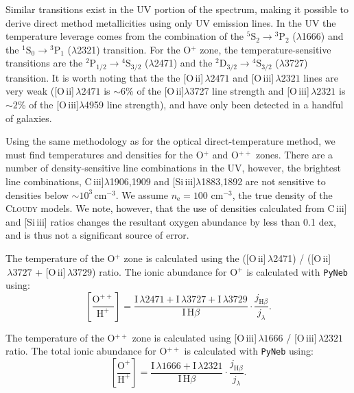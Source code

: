 \documentclass[preprint2]{aastex62}
\newcommand{\Cloudy}{\textsc{Cloudy}\xspace}
\newcommand{\oiii}{[O\,{\sc iii}]\xspace}
\newcommand{\oii}{[O\,{\sc ii}]\xspace}
\newcommand{\SiuIII}{[Si\,{\sc iii}]\xspace}
\newcommand{\ciii}{C\,{\sc iii}]\xspace}
\begin{document}
Similar transitions exist in the UV portion of the spectrum, making it possible to derive direct method metallicities using only UV emission lines. In the UV the temperature leverage comes from the combination of the ${}^5 \mathrm{S}_2 \rightarrow {}^3 \mathrm{P}_2$ ($\lambda$1666) and the ${}^1 \mathrm{S}_0 \rightarrow {}^3 \mathrm{P}_1$ ($\lambda$2321) transition. For the O$^{+}$ zone, the temperature-sensitive transitions are the ${}^2 \mathrm{P}_{1/2} \rightarrow {}^4 \mathrm{S}_{3/2}$ ($\lambda$2471) and the ${}^2 \mathrm{D}_{3/2} \rightarrow {}^4 \mathrm{S}_{3/2}$ ($\lambda$3727) transition. It is worth noting that the the \oii$\,\lambda2471$ and \oiii$\,\lambda2321$ lines are very weak (\oii$\,\lambda2471$ is ${\sim}6$\% of the \oii$\lambda$3727 line strength and \oiii$\,\lambda2321$ is ${\sim}2$\% of the \oiii$\lambda$4959 line strength), and have only been detected in a handful of galaxies.

Using the same methodology as for the optical direct-temperature method, we must find temperatures and densities for the O$^{+}$ and O$^{++}$ zones. There are a number of density-sensitive line combinations in the UV, however, the brightest line combinations, \ciii$\lambda$1906,1909 and \SiuIII$\lambda$1883,1892 are not sensitive to densities below $\sim10^3\,$cm$^{-3}$. We assume $n_{\mathrm{e}} = 100$ cm$^{-3}$, the true density of the \Cloudy models. We note, however, that the use of densities calculated from \ciii and \SiuIII ratios changes the resultant oxygen abundance by less than 0.1 dex, and is thus not a significant source of error.

The temperature of the O$^{+}$ zone is calculated using the (\oii$\,\lambda$2471) / (\oii$\,\lambda 3727$ + \oii$\,\lambda 3729$) ratio. The ionic abundance for O$^{+}$ is calculated with {\tt PyNeb} using:
\begin{equation}
    \left[ \frac{\mathrm{O}^{++}}{\mathrm{H}^{+}} \right] = \frac{\mathrm{I}\,\lambda 2471 +\mathrm{I}\,\lambda 3727 + \mathrm{I}\,\lambda 3729}{\mathrm{I}\,\mathrm{H}\beta} \cdot \frac{j_{\mathrm{H}\beta}}{j_{\lambda}}.
\end{equation}

The temperature of the O$^{++}$ zone is calculated using \oiii$\,\lambda1666$ / \oiii$\,\lambda2321$ ratio. The total ionic abundance for O$^{++}$ is calculated with {\tt PyNeb} using:
\begin{equation}
    \left[ \frac{\mathrm{O}^{+}}{\mathrm{H}^{+}} \right] = \frac{\mathrm{I}\,\lambda 1666 +\mathrm{I}\,\lambda 2321}{\mathrm{I}\,\mathrm{H}\beta} \cdot \frac{j_{\mathrm{H}\beta}}{j_{\lambda}}.
\end{equation}
\end{document}
